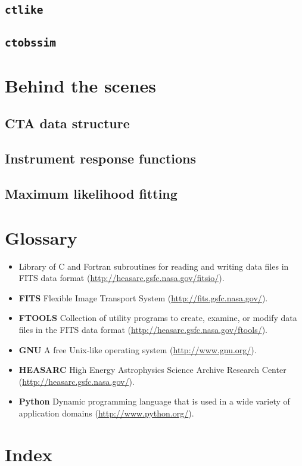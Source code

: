 \documentclass{article}[12pt,a4]
\begin{document}
\subsection{{\tt ctlike}}

\subsection{{\tt ctobssim}}


\section{Behind the scenes}

\subsection{CTA data structure}

\subsection{Instrument response functions}

\subsection{Maximum likelihood fitting}


\section{Glossary}
\begin{itemize}
\item[] {\bf \cfitsio}\break
  Library of C and Fortran subroutines for reading and writing data files in FITS data format\break
  (\url{http://heasarc.gsfc.nasa.gov/fitsio/}).
\item[] {\bf FITS\label{gloss:fits}}\break
  Flexible Image Transport System (\url{http://fits.gsfc.nasa.gov/}).
\item[] {\bf FTOOLS}\break
  Collection of utility programs to create, examine, or modify data files in the FITS data format\break
  (\url{http://heasarc.gsfc.nasa.gov/ftools/}).
\item[] {\bf GNU}\break
  A free Unix-like operating system (\url{http://www.gnu.org/}).
\item[] {\bf HEASARC}\break
  High Energy Astrophysics Science Archive Research Center (\url{http://heasarc.gsfc.nasa.gov/}).
\item[] {\bf Python}\break
  Dynamic programming language that is used in a wide variety of application domains\break
  (\url{http://www.python.org/}).
\end{itemize}


\section{Index}
\printindex
\end{document}
